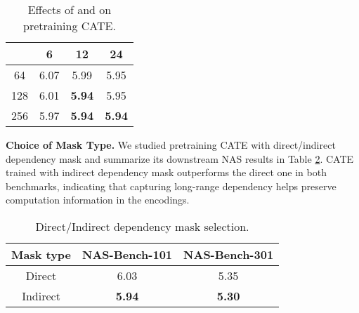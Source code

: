 \begin{table}[ht] 
\begin{adjustbox}{width=0.71\columnwidth,center}
\scriptsize{
\begin{tabular}{c|c|c|c} 
\hline
\diagbox[]{}{} & 6 & 12 & 24 \\ \hline
64  & 6.07 &  5.99 & 5.95  \\ 
128 & 6.01 & \textbf{5.94} & 5.95   \\
256  & 5.97 & \textbf{5.94} & \textbf{5.94}  \\
\hline
\end{tabular} 
}
\end{adjustbox}
\caption{Effects of  and  on pretraining CATE.}
\label{table:transformer_choice}
\end{table} 



\textbf{Choice of Mask Type.} We studied pretraining CATE with direct/indirect dependency mask and summarize its downstream NAS results in Table \ref{table:mask_type}. CATE trained with indirect dependency mask outperforms the direct one in both benchmarks, indicating that capturing long-range dependency helps preserve computation information in the encodings.



\begin{table}[ht]
\centering
\begin{adjustbox}{width=0.81\columnwidth}
{\small
\begin{tabular}{@{}c|c|c@{}}
\toprule
\multicolumn{1}{c}{\textbf{Mask type}} & \multicolumn{1}{c}{\textbf{NAS-Bench-101}} & \multicolumn{1}{c}{\textbf{NAS-Bench-301}} \\ 
\midrule 
Direct  & 6.03 & 5.35  \\ 
Indirect  & \textbf{5.94} & \textbf{5.30}  \\ 
\bottomrule
\end{tabular}
}
\end{adjustbox}
\caption{Direct/Indirect dependency mask selection.}
\label{table:mask_type}
\end{table}
